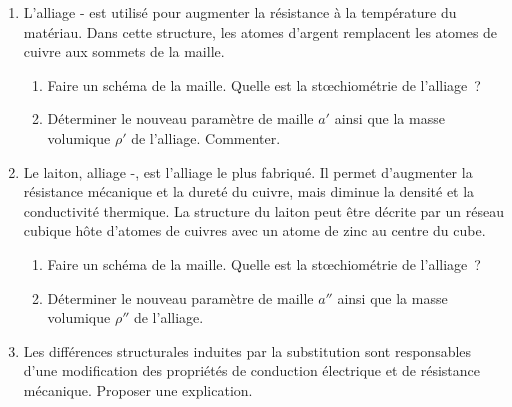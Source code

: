 \documentclass[a4paper, 10pt, final, garamond]{book}
\begin{document}
\begin{enumerate}[resume]
	\item L'alliage - est utilisé pour augmenter la résistance à la
	      température du matériau. Dans cette structure, les atomes d'argent
	      remplacent les atomes de cuivre aux sommets de la maille.
	      \begin{enumerate}
		      \item Faire un schéma de la maille. Quelle est la stœchiométrie de
		            l'alliage~?
		      \item Déterminer le nouveau paramètre de maille $a'$ ainsi que la masse
		            volumique $\rho'$ de l'alliage. Commenter.
	      \end{enumerate}
	\item Le laiton, alliage -, est l'alliage le plus fabriqué. Il
	      permet d'augmenter la résistance mécanique et la dureté du cuivre, mais
	      diminue la densité et la conductivité thermique. La structure du laiton peut
	      être décrite par un réseau cubique hôte d'atomes de cuivres avec un atome de
	      zinc au centre du cube.
	      \begin{enumerate}
		      \item Faire un schéma de la maille. Quelle est la stœchiométrie de
		            l'alliage~?
		      \item Déterminer le nouveau paramètre de maille $a''$ ainsi que la masse
		            volumique $\rho''$ de l'alliage.
	      \end{enumerate}
	\item Les différences structurales induites par la substitution sont
	      responsables d'une modification des propriétés de conduction électrique et
	      de résistance mécanique. Proposer une explication.
\end{enumerate}
\end{document}
